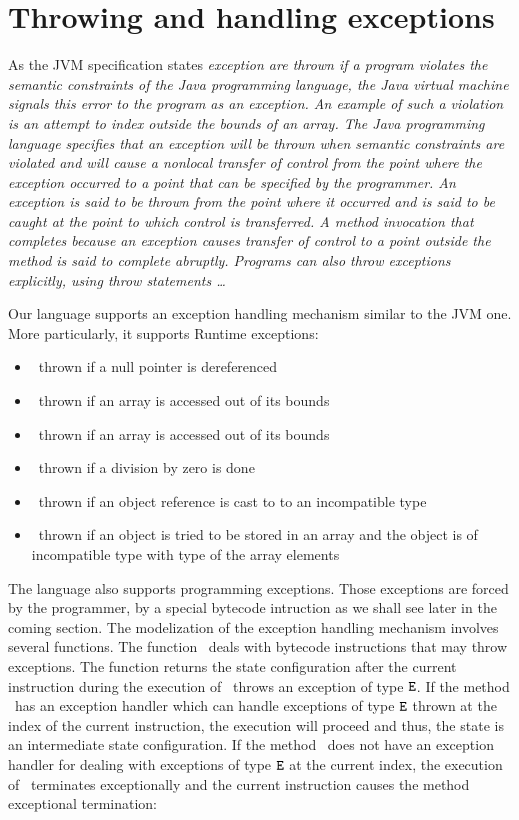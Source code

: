 \section{Throwing and handling exceptions}\label{opSem:exc}

As the JVM specification states \textit{exception are thrown if a program violates the semantic constraints of the Java programming language,
 the Java virtual machine signals this error to the program as an exception. An example of such a violation is an 
attempt to index outside the bounds of an array. The Java programming language specifies that an exception will be thrown when
 semantic constraints are violated and will cause a nonlocal transfer of control from the point where the exception occurred to
 a point that can be specified by the programmer. An exception is said to be thrown from the point where it occurred and is said to be
 caught at the point to which control is transferred. A method invocation that completes because an exception causes transfer of
 control to a point outside the method is said to complete abruptly. Programs can also throw exceptions explicitly, using throw statements \ldots }

Our language supports an exception handling mechanism similar to the JVM one.
 More particularly, it supports  Runtime exceptions: 
 \begin{itemize}
   \item \NullPointerExc \ thrown if a null pointer is dereferenced
   \item \NegativeArraySizeExc \ thrown if an array is accessed out of its bounds
   \item \ArrIndexOutOfBoundExc \ thrown if an array is accessed out of its bounds
   \item \ArithExc \ thrown if a division by zero is done
   \item \ClassCastExc \ thrown if an object reference is cast to to an incompatible type
   \item \ArrStoreExc \ thrown if an object is tried to be stored in an array and the object is of incompatible type with type of the  array elements
\end{itemize}

The language also supports programming exceptions. Those exceptions are forced by the programmer, by a special bytecode 
intruction as we shall see later in the coming section. 
The modelization of the exception handling mechanism involves several functions. 
 The function \getStateAfterExc \ deals with bytecode instructions that may throw exceptions. The function returns the state 
 configuration after the current instruction during the execution of \methodd \ throws an exception of type $\mbox{\rm\texttt{E}}$. If the  method
 \methodd \ has an  exception handler which can handle  exceptions of type $\mbox{\rm\texttt{E}}$ thrown at the index of the current  instruction,
 the execution will proceed and thus, the state is an intermediate state configuration.
 If the method \methodd \ does not have an exception handler for dealing with exceptions of type $\mbox{\rm\texttt{E}}$ 
 at the current index, the execution of \methodd \ terminates exceptionally and the current instruction
 causes the method exceptional termination:

